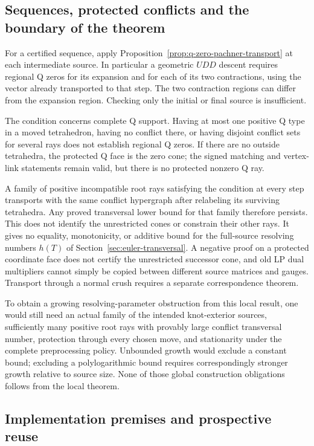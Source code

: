 \subsection{Sequences, protected conflicts and the boundary of the theorem}

For a certified sequence, apply
Proposition~\ref{prop:q-zero-pachner-transport} at each intermediate
source.  In particular a geometric $UDD$ descent requires regional
Q zeros for its expansion and for each of its two contractions, using
the vector already transported to that step.  The two contraction
regions can differ from the expansion region.  Checking only the
initial or final source is insufficient.

The condition concerns complete Q support.  Having at most one positive
Q type in a moved tetrahedron, having no conflict there, or having
disjoint conflict sets for several rays does not establish regional
Q zeros.  If there are no outside tetrahedra, the protected Q face is
the zero cone; the signed matching and vertex-link statements remain
valid, but there is no protected nonzero Q ray.

A family of positive incompatible root rays satisfying the condition
at every step transports with the same conflict hypergraph after
relabeling its surviving tetrahedra.  Any proved transversal lower
bound for that family therefore persists.  This does not identify
the unrestricted cones or constrain their other rays.  It gives no
equality, monotonicity, or additive bound for the full-source resolving
numbers $h(T)$ of Section~\ref{sec:euler-transversal}.  A negative proof
on a protected coordinate face does not certify the unrestricted
successor cone, and old LP dual multipliers cannot simply be copied
between different source matrices and gauges.  Transport through a
normal crush requires a separate correspondence theorem.

To obtain a growing resolving-parameter obstruction from this local
result, one would still need an actual family of the intended
knot-exterior sources, sufficiently many positive root rays with
provably large conflict transversal number, protection through every
chosen move, and stationarity under the complete preprocessing policy.
Unbounded growth would exclude a constant bound; excluding a
polylogarithmic bound requires correspondingly stronger growth relative
to source size.  None of those global construction obligations follows
from the local theorem.

\subsection{Implementation premises and prospective reuse}

